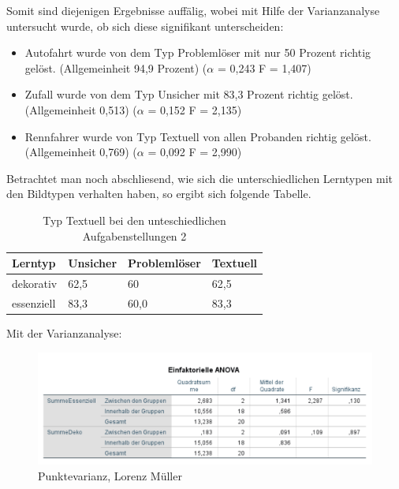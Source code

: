 Somit sind diejenigen Ergebnisse auffälig, wobei mit Hilfe der Varianzanalyse untersucht wurde, ob sich diese signifikant unterscheiden: 

\begin{itemize}
    \item Autofahrt wurde von dem Typ Problemlöser mit nur 50 Prozent richtig gelöst. (Allgemeinheit 94,9 Prozent) ($\alpha$ = 0,243 F = 1,407)
    \item Zufall wurde von dem Typ Unsicher mit 83,3 Prozent richtig gelöst. (Allgemeinheit 0,513) ($\alpha$ = 0,152 F = 2,135)
    \item Rennfahrer wurde von Typ Textuell von allen Probanden richtig gelöst. (Allgemeinheit 0,769) ($\alpha$ = 0,092 F = 2,990)
\end{itemize}

Betrachtet man noch abschliesend, wie sich die unterschiedlichen Lerntypen mit den Bildtypen verhalten haben, so ergibt sich folgende Tabelle.

\begin{table}[!h]
\hspace{-5pt}
\begin{tabularx}{\textwidth + 5pt}{| @{\hspace{3pt}} M | @{\hspace{3pt}} M  | @{\hspace{3pt}} M | @{\hspace{3pt}} M |}
\hline
\textbf{Lerntyp} & \textbf{Unsicher} & \textbf{Problemlöser} & \textbf{Textuell}\\
\hline
\hline
    dekorativ & 62,5 & 60 &  62,5\\
\hline
    essenziell & 83,3 & 60,0 &  83,3\\
\hline
\end{tabularx}
\caption{Typ Textuell bei den unteschiedlichen Aufgabenstellungen 2}
\end{table}

Mit der Varianzanalyse: 

\begin{figure}[!ht]
\noindent\hspace{0.5mm}\includegraphics[width=15cm]{./Ressourcen/DekoEssGruppen.png}
\caption{Punktevarianz, Lorenz Müller}
\end{figure}


